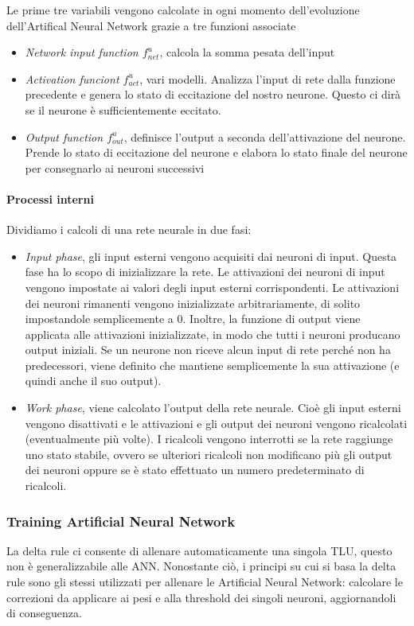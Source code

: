 Le prime tre variabili vengono calcolate in ogni momento dell’evoluzione dell’Artifical Neural Network grazie a tre funzioni associate
\begin{itemize}
    \item \textit{Network input function $f^u_{net}$}, calcola la somma pesata dell’input
    \item \textit{Activation funciont $f^u_{act}$}, vari modelli. Analizza l'input di rete dalla funzione precedente e genera lo stato di eccitazione del nostro neurone. Questo ci dirà se il neurone è sufficientemente eccitato.
    \item \textit{Output function $f^u_{out}$}, definisce l'output a seconda dell'attivazione del neurone. Prende lo stato di eccitazione del neurone e elabora lo stato finale del neurone per consegnarlo ai neuroni successivi
\end{itemize}

\paragraph{Processi interni}
Dividiamo i calcoli di una rete neurale in due fasi:
\begin{itemize}
    \item \textit{Input phase}, gli input esterni vengono acquisiti dai neuroni di input. Questa fase ha lo scopo di inizializzare la rete. Le attivazioni dei neuroni di input vengono impostate ai valori degli input esterni corrispondenti. Le attivazioni dei neuroni rimanenti vengono inizializzate arbitrariamente, di solito impostandole semplicemente a $0$. Inoltre, la funzione di output viene applicata alle attivazioni inizializzate, in modo che tutti i neuroni producano output iniziali. Se un neurone non riceve alcun input di rete perché non ha predecessori, viene definito che mantiene semplicemente la sua attivazione (e quindi anche il suo output).
    \item \textit{Work phase}, viene calcolato l'output della rete neurale. Cioè gli input esterni vengono disattivati e le attivazioni e gli output dei neuroni vengono ricalcolati (eventualmente più volte). I ricalcoli vengono interrotti se la rete raggiunge uno stato stabile, ovvero se ulteriori ricalcoli non modificano più gli output dei neuroni oppure se è stato effettuato un numero predeterminato di ricalcoli.
\end{itemize}

\subsubsection{Training Artificial Neural Network}
La delta rule ci consente di allenare automaticamente una singola TLU, questo non è generalizzabile alle ANN. Nonostante ciò, i principi su cui si basa la delta rule sono gli stessi utilizzati per allenare le Artificial Neural Network: calcolare le correzioni da applicare ai pesi e alla threshold dei singoli neuroni, aggiornandoli di conseguenza.
